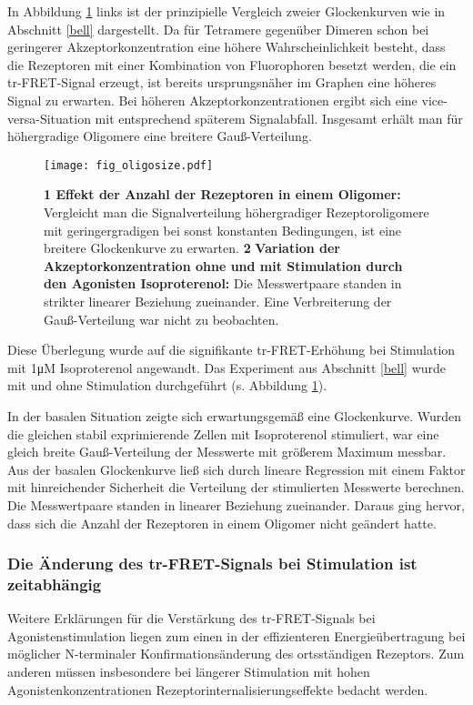 In Abbildung \ref{fig:oligosize_scheme} links ist der prinzipielle Vergleich zweier Glockenkurven wie in Abschnitt \ref{bell} dargestellt. Da für Tetramere gegenüber Dimeren schon bei geringerer Akzeptorkonzentration eine höhere Wahrscheinlichkeit besteht, dass die Rezeptoren mit einer Kombination von Fluorophoren besetzt werden, die ein tr-FRET-Signal erzeugt, ist bereits ursprungsnäher im Graphen eine höheres Signal zu erwarten. Bei höheren Akzeptorkonzentrationen ergibt sich eine vice-versa-Situation mit entsprechend späterem Signalabfall. Insgesamt erhält man für höhergradige Oligomere eine breitere Gauß-Verteilung.

\begin{figure}[htbp]
	\centering
    \texttt{[image: fig\_oligosize.pdf]}
    \caption{\textbf{1 Effekt der Anzahl der Rezeptoren in einem Oligomer:}  Vergleicht man die Signalverteilung höhergradiger Rezeptoroligomere mit geringergradigen bei sonst konstanten Bedingungen, ist eine breitere Glockenkurve zu erwarten. \textbf{2} \textbf{Variation der Akzeptorkonzentration ohne und mit Stimulation durch den Agonisten Isoproterenol:} Die Messwertpaare standen in strikter linearer Beziehung zueinander. Eine Verbreiterung der Gauß-Verteilung war nicht zu beobachten.} 
    \label{fig:oligosize_scheme}
\end{figure}

Diese Überlegung wurde auf die signifikante tr-FRET-Erhöhung bei Stimulation mit 1\si{\micro M} Isoproterenol angewandt. Das Experiment aus Abschnitt \ref{bell} wurde mit und ohne Stimulation durchgeführt (s. Abbildung \ref{fig:oligosize_scheme}). 

In der basalen Situation zeigte sich erwartungsgemäß eine Glockenkurve. Wurden die gleichen stabil exprimierende Zellen mit Isoproterenol stimuliert, war eine gleich breite Gauß-Verteilung der Messwerte mit größerem Maximum messbar. Aus der basalen Glockenkurve ließ sich durch lineare Regression mit einem Faktor mit hinreichender Sicherheit die Verteilung der stimulierten Messwerte berechnen. Die Messwertpaare standen in linearer Beziehung zueinander. Daraus ging hervor, dass sich die Anzahl der Rezeptoren in einem Oligomer nicht geändert hatte.

\subsubsection{Die Änderung des tr-FRET-Signals bei Stimulation ist zeitabhängig} 
 
Weitere Erklärungen für die Verstärkung des tr-FRET-Signals bei Agonistenstimulation liegen zum einen in der effizienteren Energieübertragung bei möglicher N-terminaler Konfirmationsänderung des ortsständigen Rezeptors. Zum anderen müssen insbesondere bei längerer Stimulation mit hohen Agonistenkonzentrationen Rezeptorinternalisierungseffekte bedacht werden.

